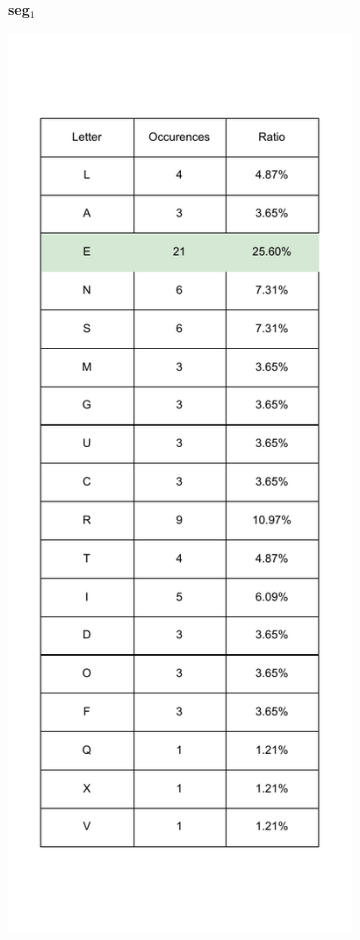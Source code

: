 \begin{figure}[htb]
\begin{subfigure}[t]{0.32\textwidth}
    \caption*{\textbf{seg\(_1\)}}
  \end{subfigure}%
  \hfill
  \begin{subfigure}[t]{0.32\textwidth}
    \centering
    \includegraphics[height=0.45\textheight]{Chapters/Diagram/Crypto/seg_2.drawio.pdf}

\end{subfigure}
\end{figure}
